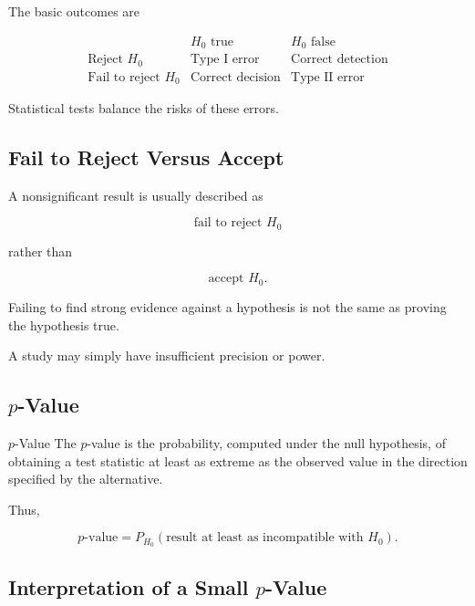 The basic outcomes are

\[
\begin{array}{c|cc}
&
H_0\text{ true}
&
H_0\text{ false}
\\
\hline
\text{Reject }H_0
&
\text{Type I error}
&
\text{Correct detection}
\\
\text{Fail to reject }H_0
&
\text{Correct decision}
&
\text{Type II error}
\end{array}
\]

Statistical tests balance the risks of these errors.

\subsection{Fail to Reject Versus Accept}
\label{subsec:fail-to-reject}

A nonsignificant result is usually described as

\[
\boxed{
\text{fail to reject }H_0
}
\]

rather than

\[
\boxed{
\text{accept }H_0.
}
\]

Failing to find strong evidence against a hypothesis is not the same as
proving the hypothesis true.

A study may simply have insufficient precision or power.

\subsection{\(p\)-Value}
\label{subsec:p-value}

\begin{definitionbox}{\(p\)-Value}
The \(p\)-value is the probability, computed under the null hypothesis,
of obtaining a test statistic at least as extreme as the observed value
in the direction specified by the alternative.
\end{definitionbox}

Thus,

\[
\boxed{
p\text{-value}
=
P_{H_0}
(
\text{result at least as incompatible with }H_0
).
}
\]

\subsection{Interpretation of a Small \(p\)-Value}
\label{subsec:small-p-value}

